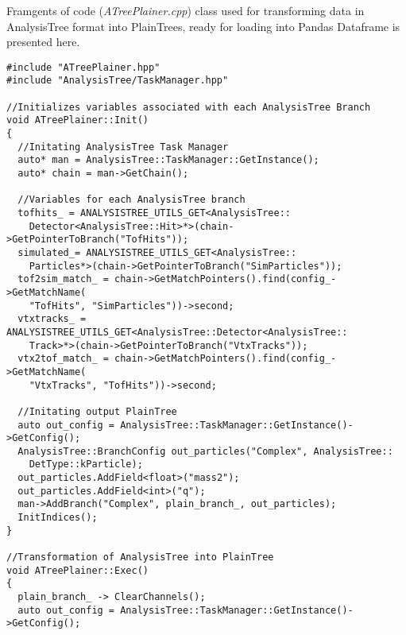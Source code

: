\pagestyle{fancy}
\thispagestyle{fancy}

Framgents of code (\emph{ATreePlainer.cpp}) class used for transforming data in AnalysisTree format into PlainTrees, ready for loading into Pandas Dataframe is presented here.

\lstset{language=C++}
\begin{lstlisting}
#include "ATreePlainer.hpp"
#include "AnalysisTree/TaskManager.hpp"

//Initializes variables associated with each AnalysisTree Branch
void ATreePlainer::Init()
{
  //Initating AnalysisTree Task Manager
  auto* man = AnalysisTree::TaskManager::GetInstance();
  auto* chain = man->GetChain();

  //Variables for each AnalysisTree branch
  tofhits_ = ANALYSISTREE_UTILS_GET<AnalysisTree::
    Detector<AnalysisTree::Hit>*>(chain->GetPointerToBranch("TofHits"));
  simulated_= ANALYSISTREE_UTILS_GET<AnalysisTree::
    Particles*>(chain->GetPointerToBranch("SimParticles"));
  tof2sim_match_ = chain->GetMatchPointers().find(config_->GetMatchName(
    "TofHits", "SimParticles"))->second;
  vtxtracks_ = ANALYSISTREE_UTILS_GET<AnalysisTree::Detector<AnalysisTree::
    Track>*>(chain->GetPointerToBranch("VtxTracks"));
  vtx2tof_match_ = chain->GetMatchPointers().find(config_->GetMatchName(
    "VtxTracks", "TofHits"))->second;

  //Initating output PlainTree
  auto out_config = AnalysisTree::TaskManager::GetInstance()->GetConfig();
  AnalysisTree::BranchConfig out_particles("Complex", AnalysisTree::
    DetType::kParticle);
  out_particles.AddField<float>("mass2");
  out_particles.AddField<int>("q");
  man->AddBranch("Complex", plain_branch_, out_particles);
  InitIndices();
}

//Transformation of AnalysisTree into PlainTree
void ATreePlainer::Exec()
{
  plain_branch_ -> ClearChannels();
  auto out_config = AnalysisTree::TaskManager::GetInstance()->GetConfig();


\end{lstlisting}
